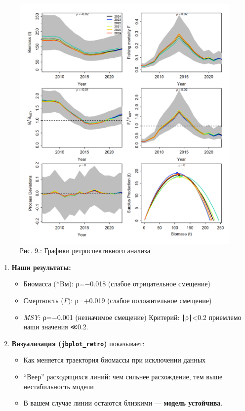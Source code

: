 \documentclass[
  letterpaper,
  DIV=11,
  numbers=noendperiod]{scrreprt}
\begin{document}
\begin{figure}[H]

{\centering \includegraphics[width=0.8\linewidth,height=\textheight,keepaspectratio]{images/JABBA9.PNG}

}

\caption{Рис. 9.: Графики ретроспективного анализа}

\end{figure}%

\begin{enumerate}
\def\labelenumi{\arabic{enumi}.}
\item
  \textbf{Наши результаты:}

  \begin{itemize}
  \item
    Биомасса (*Bм): ρ=−0.018 (слабое отрицательное смещение)
  \item
    Смертность (\emph{F}): ρ=+0.019 (слабое положительное смещение)
  \item
    \emph{MSY}: ρ=−0.001 (незначимое смещение) Критерий: ∣ρ∣\textless0.2
    приемлемо наши значения ≪0.2.
  \end{itemize}
\item
  \textbf{Визуализация (\texttt{jbplot\_retro})} показывает:

  \begin{itemize}
  \item
    Как меняется траектория биомассы при исключении данных
  \item
    ``Веер'' расходящихся линий: чем сильнее расхождение, тем выше
    нестабильность модели
  \item
    В вашем случае линии остаются близкими --- \textbf{модель
    устойчива}.
  \end{itemize}
\end{enumerate}
\end{document}

